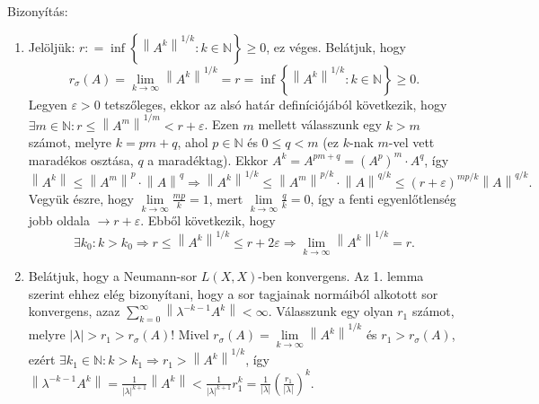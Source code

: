 \documentclass[12pt,a4paper]{scrartcl}
\providecommand{\tightlist}{%
  \setlength{\itemsep}{0pt}\setlength{\parskip}{0pt}}
\newenvironment{bizonyitas}{}{}
\begin{document}
\begin{bizonyitas}

Bizonyítás:

\begin{enumerate}
\def\labelenumi{\arabic{enumi}.}
\tightlist
\item
  Jelöljük:
  \(r: = \inf\left\{ {\left\| A^{k} \right\|^{1/k}:k \in {\mathbb{N}}} \right\} \geq 0\),
  ez véges. Belátjuk, hogy
  \[r_{\sigma}\left( A \right) = \lim\limits_{k\rightarrow\infty}\left\| A^{k} \right\|^{1/k} = r = \inf\left\{ {\left\| A^{k} \right\|^{1/k}:k \in {\mathbb{N}}} \right\} \geq 0.\]
  Legyen \(\varepsilon > 0\) tetszőleges, ekkor az alsó határ
  definíciójából következik, hogy
  \(\exists m \in {\mathbb{N}}:r \leq \left\| A^{m} \right\|^{1/m} < r + \varepsilon\).
  Ezen \(m\) mellett válasszunk egy \(k > m\) számot, melyre
  \(k = pm + q\), ahol \(p \in {\mathbb{N}}\) és \(0 \leq q < m\) (ez
  \(k\)-nak \(m\)-vel vett maradékos osztása, \(q\) a maradéktag). Ekkor
  \(A^{k} = A^{pm + q} = \left( A^{p} \right)^{m} \cdot A^{q}\), így
  \[\left. \left\| A^{k} \right\| \leq \left\| A^{m} \right\|^{p} \cdot \left\| A \right\|^{q}\Rightarrow\left\| A^{k} \right\|^{1/k} \leq \left\| A^{m} \right\|^{p/k} \cdot \left\| A \right\|^{q/k} \leq \left( {r + \varepsilon} \right)^{mp/k}\left\| A \right\|^{q/k}. \right.\]
  Vegyük észre, hogy
  \(\lim\limits_{k\rightarrow\infty}\frac{mp}{k} = 1\), mert
  \(\lim\limits_{k\rightarrow\infty}\frac{q}{k} = 0\), így a fenti
  egyenlőtlenség jobb oldala
  \(\left. \rightarrow r + \varepsilon \right.\). Ebből következik, hogy
  \[\left. \exists k_{0}:k > k_{0}\Rightarrow r \leq \left\| A^{k} \right\|^{1/k} \leq r + 2\varepsilon\Rightarrow\lim\limits_{k\rightarrow\infty}\left\| A^{k} \right\|^{1/k} = r. \right.\]
\item
  Belátjuk, hogy a Neumann-sor \(L\left( {X,X} \right)\)-ben konvergens.
  Az 1. lemma szerint ehhez elég bizonyítani, hogy a sor tagjainak
  normáiból alkotott sor konvergens, azaz
  \({\sum\limits_{k = 0}^{\infty}\left\| {\lambda^{- k - 1}A^{k}} \right\|} < \infty\).
  Válasszunk egy olyan \(r_{1}\) számot, melyre
  \(\left| \lambda \right| > r_{1} > r_{\sigma}\left( A \right)\)! Mivel
  \(r_{\sigma}\left( A \right) = \lim\limits_{k\rightarrow\infty}\left\| A^{k} \right\|^{1/k}\)
  és \(r_{1} > r_{\sigma}\left( A \right)\), ezért
  \(\left. \exists k_{1} \in {\mathbb{N}}:k > k_{1}\Rightarrow r_{1} > \left\| A^{k} \right\|^{1/k} \right.\),
  így
  \(\left\| {\lambda^{- k - 1}A^{k}} \right\| = \frac{1}{\left| \lambda \right|^{k + 1}}\left\| A^{k} \right\| < \frac{1}{\left| \lambda \right|^{k + 1}}r_{1}^{k} = \frac{1}{\left| \lambda \right|}\left( \frac{r_{1}}{\left| \lambda \right|} \right)^{k}\).

\end{enumerate}
\end{bizonyitas}
\end{document}
